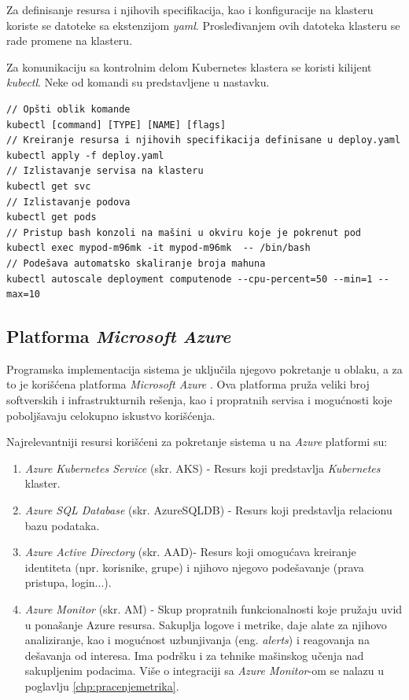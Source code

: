 \documentclass[12pt,oneside]{memoir}
\begin{document}
Za definisanje resursa i njihovih specifikacija, kao i konfiguracije na klasteru koriste se datoteke sa ekstenzijom \emph{yaml}. Prosleđivanjem ovih datoteka klasteru se rade promene na klasteru.

Za komunikaciju sa kontrolnim delom Kubernetes klastera se koristi kilijent \emph{kubectl}. Neke od komandi su predstavljene u nastavku.

\begin{verbatim}
// Opšti oblik komande
kubectl [command] [TYPE] [NAME] [flags]
// Kreiranje resursa i njihovih specifikacija definisane u deploy.yaml
kubectl apply -f deploy.yaml
// Izlistavanje servisa na klasteru
kubectl get svc
// Izlistavanje podova
kubectl get pods
// Pristup bash konzoli na mašini u okviru koje je pokrenut pod
kubectl exec mypod-m96mk -it mypod-m96mk  -- /bin/bash
// Podešava automatsko skaliranje broja mahuna
kubectl autoscale deployment computenode --cpu-percent=50 --min=1 --max=10
\end{verbatim}

\subsection{Platforma \emph{Microsoft Azure}}
\label{sub:azureplatform}

Programska implementacija sistema je uključila njegovo pokretanje u oblaku, a za to je korišćena platforma \emph{Microsoft Azure} \cite{Azure}. Ova platforma pruža veliki broj softverskih i infrastrukturnih rešenja, kao i propratnih servisa i mogućnosti koje poboljšavaju celokupno iskustvo korišćenja.

Najrelevantniji resursi korišćeni za pokretanje sistema u na \emph{Azure} platformi su:
\begin{enumerate}
\item \emph{Azure Kubernetes Service} (skr. AKS) \cite{AKS} - Resurs koji predstavlja \emph{Kubernetes} klaster.
\item \emph{Azure SQL Database} (skr. AzureSQLDB) \cite{AzureSQLDB} - Resurs koji predstavlja relacionu bazu podataka.
\item \emph{Azure Active Directory} \cite{AAD}  (skr. AAD)- Resurs koji omogućava kreiranje identiteta (npr. korisnike, grupe) i njihovo njegovo podešavanje (prava pristupa, login...).
\item \emph{Azure Monitor} (skr. AM) \cite{AzureMonitor} - Skup propratnih funkcionalnosti koje pružaju uvid u ponašanje Azure resursa. Sakuplja logove i metrike, daje alate za njihovo analiziranje, kao i mogućnost uzbunjivanja (eng. \emph{alerts}) i reagovanja na dešavanja od interesa. Ima podršku i za tehnike mašinskog učenja nad sakupljenim podacima. Više o integraciji sa \emph{Azure Monitor}-om se nalazu u poglavlju \ref{chp:pracenjemetrika}.
\end{enumerate}
\end{document}
